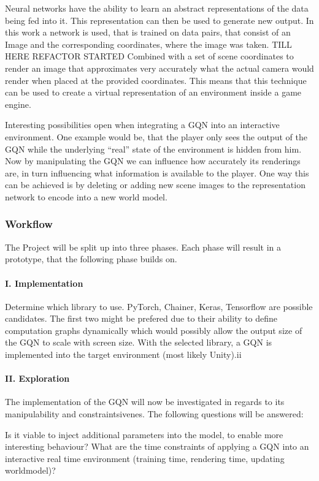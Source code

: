 \documentclass[a4paper, twoside, 10pt]{report}
\begin{document}
Neural networks have the ability to learn an abstract representations of the data being fed into it. This representation can then be used to generate new output. In this work a network is used, that is trained on data pairs, that consist of an Image and the corresponding coordinates, where the image was taken. {\color{red}TILL HERE REFACTOR STARTED} Combined with a set of scene coordinates to render an image that approximates very accurately what the actual camera would render when placed at the provided coordinates. This means that this technique can be used to create a virtual representation of an environment inside a game engine. 

Interesting possibilities open when integrating a GQN into an interactive environment. One example would be, that the player only sees the output of the GQN while the underlying “real” state of the environment is hidden from him. Now by manipulating the GQN we can influence how accurately its renderings are, in turn influencing what information is available to the player. One way this can be achieved is by deleting or adding new scene images to the representation network to encode into a new world model.

\subsubsection{Workflow}
The Project will be split up into three phases. Each phase will result in a prototype, that the following phase builds on.

\paragraph{I.  Implementation}
Determine which library to use. PyTorch, Chainer, Keras, Tensorflow are possible candidates. The first two might be prefered due to their ability to define computation graphs dynamically which would possibly allow the output size of the GQN to scale with screen size. With the selected library, a GQN is implemented into the target environment (most likely Unity).ii

\paragraph{II. Exploration}
The implementation of the GQN will now be investigated in regards to its manipulability and  constraintsivenes. The following questions will be answered:

Is it viable to inject additional parameters into the model, to enable more interesting behaviour?
What are the time constraints of applying a GQN into an interactive real time environment (training time, rendering time, updating worldmodel)?
\end{document}
